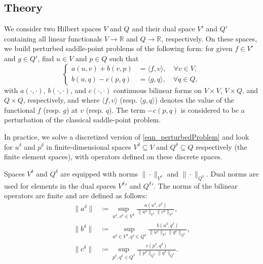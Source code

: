\documentclass[journal]{IEEEtran}
\newcommand{\Def}{\coloneqq}
\begin{document}
\subsection{Theory}

We consider two Hilbert spaces $V$ and $Q$ and their dual space $V'$ and $Q'$ containing all linear functionals $V\to \mathbb{R}$ and $Q\to \mathbb{R}$, respectively. On these spaces, we build perturbed saddle-point problems of the following form: for given $f\in V'$ and $g\in Q'$, find $u\in V$ and $p\in Q$ such that
\begin{equation}\label{eqn_perturbedProblem}
\left\{
\begin{aligned}
a(u,v) + b(v,p) &= \langle f,v\rangle,\quad \forall v\in V,\\
b(u,q) - c(p,q) &= \langle g,q\rangle,\quad \forall q\in Q,
\end{aligned}\right.
\end{equation}
with $a(\cdot,\cdot)$, $b(\cdot,\cdot)$, and $c(\cdot,\cdot)$ continuous bilinear forms on $V\times V$, $V \times Q$, and $Q \times Q$, respectively, and where $\langle f, v\rangle$ (resp. $\langle g, q\rangle$) denotes the value of the functional $f$ (resp. $g$) at $v$ (resp. $q$). The term $-c(p,q)$ is considered to be a perturbation of the classical saddle-point problem.

In practice, we solve a discretized version of \eqref{eqn_perturbedProblem} and look for $u^\delta$ and $p^\delta$ in finite-dimensional spaces $V^\delta\subseteq V$ and $Q^\delta\subseteq Q$ respectively (the finite element spaces), with operators defined on these discrete spaces.

Spaces $V^\delta$ and $Q^\delta$ are equipped with norms $\|\cdot \|_{V^\delta}$ and $\|\cdot \|_{Q^\delta}$. Dual norms are used for elements in the dual spaces ${V^{\delta}}'$ and ${Q^{\delta}}'$. The norms of the bilinear operators are finite and are defined as follows:
\begin{align}
\|a^\delta\| &\Def\sup_{u^\delta,v^\delta\in V^\delta} \frac{a(u^\delta,v^\delta)}{\|u^\delta\|_{V^\delta}\|v^\delta\|_{V^\delta}}, \label{eqn_anorm}\\
\|b^\delta\| &\Def \sup_{u^\delta\in V^\delta, q^\delta\in Q^\delta} \frac{b(u^\delta,q^\delta)}{\|u^\delta\|_{V^\delta}\|q^\delta\|_{Q^\delta}}, \label{eqn_bnorm}\\
\|c^\delta\| &\Def \sup_{p^\delta,q^\delta\in Q^\delta} \frac{c(p^\delta,q^\delta)}{\|p^\delta\|_{Q^\delta}\|q^\delta\|_{Q^\delta}}. \label{eqn_cnorm}
\end{align}
\end{document}
